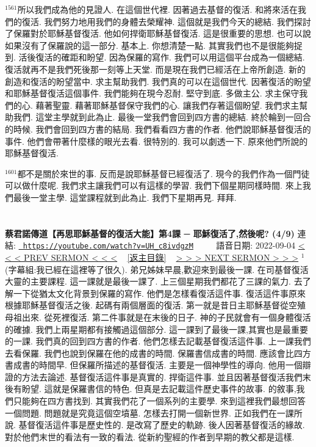 \documentclass{book}
\begin{document}
$^{1561}$所以我們成為他的見證人.
在這個世代裡.
因著過去基督的復活.
和將來活在我們的復活.
我們努力地用我們的身體去榮耀神.
這個就是我們今天的總結.
我們探討了保羅對於耶穌基督復活.
他如何捍衛耶穌基督復活.
這是很重要的思想.
也可以說如果沒有了保羅說的這一部分.
基本上.
你想清楚一點.
其實我們也不是很能夠捉到.
活後復活的確距和盼望.
因為保羅的寫作.
我們可以用這個平台成為一個總結.
復活就再不是我們死後那一刻等上天堂.
而是現在我們已經活在上帝所創造.
新的創造和復活的盼望當中.
求主幫助我們.
我們真的可以在這個世代.
因著復活的盼望和耶穌基督復活這個事件.
我們能夠在現今忍耐.
堅守到底.
多做主公.
求主保守我們的心.
藉著聖靈.
藉著耶穌基督保守我們的心.
讓我們存著這個盼望.
我們求主幫助我們.
這堂主學就到此為止.
最後一堂我們會回到四方書的總結.
終於輪到一回合的時候.
我們會回到四方書的結局.
我們看看四方書的作者.
他們說耶穌基督復活的事件.
他們會帶著什麼樣的眼光去看.
很特別的.
我可以劇透一下.
原來他們所說的耶穌基督復活.

$^{1601}$都不是關於來世的事.
反而是說耶穌基督已經復活了.
現今的我們作為一個門徒可以做什麼呢.
我們求主讓我們可以有這樣的學習.
我們下個星期同樣時間.
來上我們最後一堂主學.
這堂課程就到此為止.
我們下星期再見.
拜拜.
\newpage



\section{}
\label{sec:UH_c8ivdgzM}
\textbf{蔡君諾傳道【再思耶穌基督的復活大能】第4課 ─ 耶穌復活了,然後呢? (4/9)}
\newline
\newline
連結: \href{https://youtube.com/watch?v=UH_c8ivdgzM}{\texttt{ https://youtube.com/watch?v=UH\_c8ivdgzM}} ~~~~ 語音日期: 2022-09-04 
\newline
\newline
\hyperref[sec:A3YDD55lCCE]{\small{< < < PREV SERMON < < <}}
~
\hyperref[sec:index]{\small{[返主目錄]}}
~
\hyperref[sec:6Yg3FVlhsxs]{\small{> > > NEXT SERMON > > >}}
\newline
\newline
$^{1}$(字幕組:我已經在這裡等了很久).
弟兄姊妹早晨,歡迎來到最後一課.
在司基督復活大靈的主要課程.
這一課就是最後一課了.
上三個星期我們都花了三課的氣力.
去了解一下從猶太文化背景到保羅的寫作.
他們是怎樣看復活這件事.
復活這件事原來根據耶穌基督復活之後.
起碼有兩個層面的復活.
第一就是昔日主耶穌基督從空殖母祖出來.
從死裡復活.
第二件事就是在末後的日子.
神的子民就會有一個身體復活的確據.
我們上兩星期都有接觸過這個部分.
這一課到了最後一課,其實也是最重要的一課.
我們真的回到四方書的作者.
他們怎樣去記載基督復活這件事.
上一課我們去看保羅.
我們也說到保羅在他的成書的時間.
保羅書信成書的時間.
應該會比四方書成書的時間早.
但保羅所描述的基督復活.
主要是一個神學性的導向.
他用一個辯證的方法去論述.
基督復活這件事是真實的.
捍衛這件事.
並且因著基督復活我們末後有盼望.
這就是保羅書信的特色.
但真是去記載這件歷史事件的故事.
的敘事,我們只能夠在四方書找到.
其實我們花了一個系列的主要學.
來到這裡我們最想回答一個問題.
問題就是究竟這個空墳墓.
怎樣去打開一個新世界.
正如我們在一課所說.
基督復活這件事是歷史性的.
是改寫了歷史的軌跡.
後人因著基督復活的緣故.
對於他們末世的看法有一致的看法.
從新約聖經的作者到早期的教父都是這樣.
\end{document}
